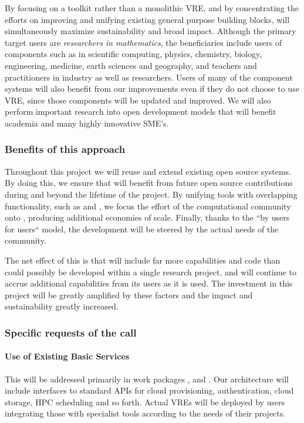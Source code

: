By focusing on a toolkit rather than a monolithic VRE, and by
concentrating the efforts on improving and unifying existing general
purpose building blocks, \TheProject
will simultaneously maximize sustainability and broad impact. Although
the primary target users are \emph{researchers in
  mathematics}, the beneficiaries include users of components such as
\Jupyter in  scientific
computing, physics, chemistry, biology, engineering, medicine, earth
sciences and geography, and  teachers
and practitioners in industry as well as researchers.
Users of many of the component systems will also benefit from our
improvements even if they do not choose to use \TheProject VRE, since
those components will be updated and improved. We will also perform
important research into open
development models that will benefit academia and many highly
innovative SME's.


\subsubsection{Benefits of this approach}

Throughout this project we will reuse and extend existing open source
systems. By doing this, we ensure that \TheProject will benefit from future open
source contributions during and beyond the lifetime of the project. By
unifying tools with overlapping functionality, such as \Jupyter and
\Sage, we focus the effort of the computational community onto
\TheProject, producing additional economies of scale. Finally, thanks
to the ``by users for users`` model, the development will be steered
by the actual needs of the community.

The net effect of this is that \TheProject will include far more
capabilities and code than could possibly be developed within a single
research project, and will continue to accrue additional capabilities
from its users as it is used. The investment in this project will be
greatly amplified by these factors and the impact and sustainability
greatly increased.





\subsubsection{Specific requests of the call}

\paragraph{Use of Existing Basic Services}
This will be addressed primarily in work packages ,
 and . Our architecture will include interfaces to standard
APIs for cloud provisioning, authentication, cloud storage, HPC scheduling and so
forth. Actual VREs will be deployed by users integrating those with specialist tools
according to the needs of their projects. 

